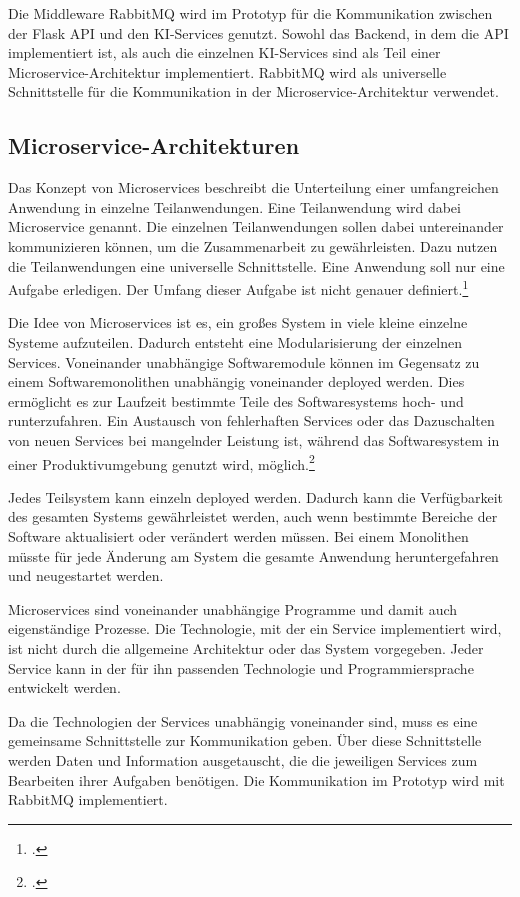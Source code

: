 Die Middleware RabbitMQ wird im Prototyp für die Kommunikation zwischen der Flask API und den KI-Services genutzt. Sowohl das Backend, in dem die API implementiert ist, als auch die einzelnen KI-Services sind als Teil einer Microservice-Architektur implementiert. RabbitMQ wird als universelle Schnittstelle für die Kommunikation in der Microservice-Architektur verwendet. 

\subsection{Microservice-Architekturen}
Das Konzept von Microservices beschreibt die Unterteilung einer umfangreichen Anwendung in einzelne Teilanwendungen. Eine Teilanwendung wird dabei Microservice genannt. Die einzelnen Teilanwendungen sollen dabei untereinander kommunizieren können, um die Zusammenarbeit zu gewährleisten. Dazu nutzen die Teilanwendungen eine universelle Schnittstelle. Eine Anwendung soll nur eine Aufgabe erledigen. Der Umfang dieser Aufgabe ist nicht genauer definiert.\footcite{wolff2018microservices}

Die Idee von Microservices ist es, ein großes System in viele kleine einzelne Systeme aufzuteilen. Dadurch entsteht eine Modularisierung der einzelnen Services. Voneinander unabhängige Softwaremodule können im Gegensatz zu einem Softwaremonolithen unabhängig voneinander deployed werden. Dies ermöglicht es zur Laufzeit bestimmte Teile des Softwaresystems hoch- und runterzufahren. Ein Austausch von fehlerhaften Services oder das Dazuschalten von neuen Services bei mangelnder Leistung ist, während das Softwaresystem in einer Produktivumgebung genutzt wird, möglich.\footcite{newman2015microservices}

Jedes Teilsystem kann einzeln deployed werden. Dadurch kann die Verfügbarkeit des gesamten Systems gewährleistet werden, auch wenn bestimmte Bereiche der Software aktualisiert oder verändert werden müssen. Bei einem Monolithen müsste für jede Änderung am System die gesamte Anwendung heruntergefahren und neugestartet werden.  

Microservices sind voneinander unabhängige Programme und damit auch eigenständige Prozesse. Die Technologie, mit der ein Service implementiert wird, ist nicht durch die allgemeine Architektur oder das System vorgegeben. Jeder Service kann in der für ihn passenden Technologie und Programmiersprache entwickelt werden. 

Da die Technologien der Services unabhängig voneinander sind, muss es eine gemeinsame Schnittstelle zur Kommunikation geben. Über diese Schnittstelle werden Daten und Information ausgetauscht, die die jeweiligen Services zum Bearbeiten ihrer Aufgaben benötigen. Die Kommunikation im Prototyp wird mit RabbitMQ implementiert. 

